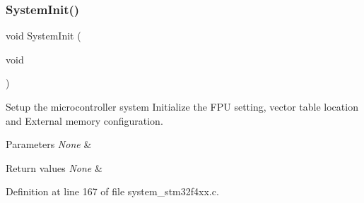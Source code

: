 \mbox{\label{group___s_t_m32_f4xx___system___private___functions_ga93f514700ccf00d08dbdcff7f1224eb2}} 
\subsubsection{\texorpdfstring{System\+Init()}{SystemInit()}}
{\footnotesize\ttfamily void System\+Init (\begin{DoxyParamCaption}\item[{void}]{ }\end{DoxyParamCaption})}



Setup the microcontroller system Initialize the F\+PU setting, vector table location and External memory configuration. 


\begin{DoxyParams}{Parameters}
{\em None} & \\
\hline
\end{DoxyParams}

\begin{DoxyRetVals}{Return values}
{\em None} & \\
\hline
\end{DoxyRetVals}


Definition at line 167 of file system\+\_\+stm32f4xx.\+c.

